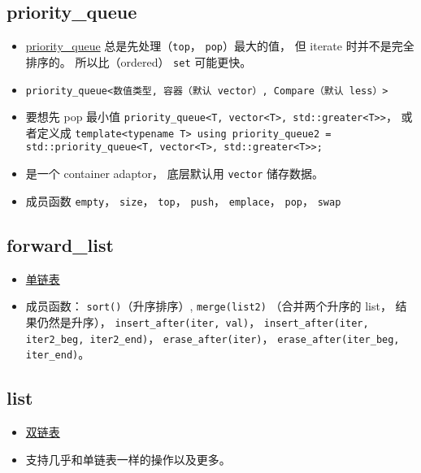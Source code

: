 \subsection{priority\_queue}
\begin{itemize}
\item \href{https://cplusplus.com/reference/queue/priority_queue/}{priority\_queue} 总是先处理（\verb|top|， \verb|pop|）最大的值， 但 iterate 时并不是完全排序的。 所以比（ordered） \verb|set| 可能更快。
\item \verb|priority_queue<数值类型, 容器（默认 vector）, Compare（默认 less）>|
\item 要想先 pop 最小值 \verb|priority_queue<T, vector<T>, std::greater<T>>|， 或者定义成 \verb|template<typename T> using priority_queue2 = std::priority_queue<T, vector<T>, std::greater<T>>;|
\item 是一个 container adaptor， 底层默认用 \verb|vector| 储存数据。
\item 成员函数 \verb|empty|， \verb|size|， \verb|top|， \verb|push|， \verb|emplace|， \verb|pop|， \verb|swap|
\end{itemize}


\subsection{forward\_list}
\begin{itemize}
\item \href{https://cplusplus.com/reference/forward_list/forward_list/}{单链表}
\item 成员函数： \verb|sort()|（升序排序）, \verb|merge(list2)| （合并两个升序的 list， 结果仍然是升序）， \verb|insert_after(iter, val)|，  \verb|insert_after(iter, iter2_beg, iter2_end)|， \verb|erase_after(iter)|， \verb|erase_after(iter_beg, iter_end)|。
\end{itemize}

\subsection{list}
\begin{itemize}
\item \href{https://cplusplus.com/reference/list/list/}{双链表}
\item 支持几乎和单链表一样的操作以及更多。
\end{itemize}
